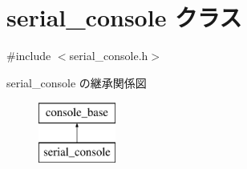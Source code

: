 \hypertarget{classserial__console}{}\section{serial\+\_\+console クラス}
\label{classserial__console}


{\ttfamily \#include $<$serial\+\_\+console.\+h$>$}

serial\+\_\+console の継承関係図\begin{figure}[H]
\begin{center}
\leavevmode
\includegraphics[height=2.000000cm]{classserial__console}
\end{center}
\end{figure}
